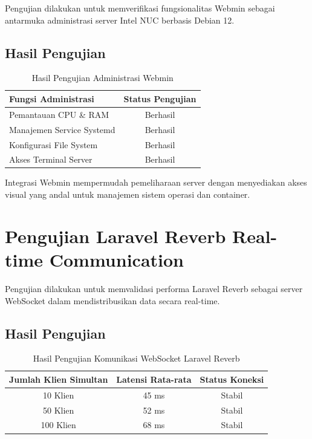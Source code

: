Pengujian dilakukan untuk memverifikasi fungsionalitas Webmin sebagai antarmuka administrasi server Intel NUC berbasis Debian 12.

\subsection{Hasil Pengujian}

\begin{table}[H]
	\centering
	\caption{Hasil Pengujian Administrasi Webmin}
	\begin{tabular}{|l|c|}
		\hline
		Fungsi Administrasi & Status Pengujian \\
		\hline
		Pemantauan CPU \& RAM & Berhasil \\
		Manajemen Service Systemd & Berhasil \\
		Konfigurasi File System & Berhasil \\
		Akses Terminal Server & Berhasil \\
		\hline
	\end{tabular}
\end{table}

Integrasi Webmin mempermudah pemeliharaan server dengan menyediakan akses visual yang andal untuk manajemen sistem operasi dan container.

\section{Pengujian Laravel Reverb Real-time Communication}

Pengujian dilakukan untuk memvalidasi performa Laravel Reverb sebagai server WebSocket dalam mendistribusikan data secara real-time.

\subsection{Hasil Pengujian}

\begin{table}[H]
	\centering
	\caption{Hasil Pengujian Komunikasi WebSocket Laravel Reverb}
	\begin{tabular}{|c|c|c|}
		\hline
		Jumlah Klien Simultan & Latensi Rata-rata & Status Koneksi \\
		\hline
		10 Klien & 45 ms & Stabil \\
		50 Klien & 52 ms & Stabil \\
		100 Klien & 68 ms & Stabil \\
		\hline
	\end{tabular}
\end{table}

